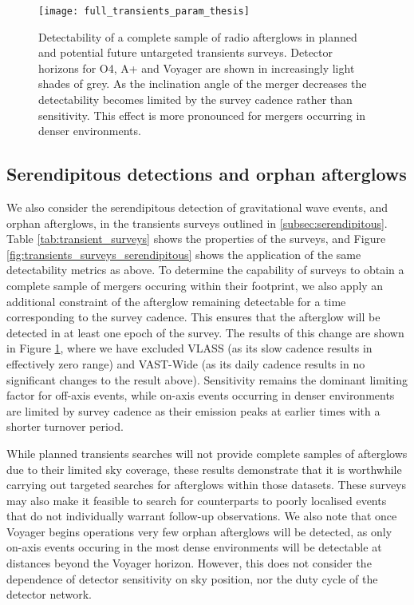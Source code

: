 \begin{figure}
    \centering
    \texttt{[image: full\_transients\_param\_thesis]}
    \vspace{-12pt}
    \caption[Complete sample of afterglows in future radio transients surveys]{Detectability of a complete sample of radio afterglows in planned and potential future untargeted transients surveys. Detector horizons for O4, A+ and Voyager are shown in increasingly light shades of grey. As the inclination angle of the merger decreases the detectability becomes limited by the survey cadence rather than sensitivity. This effect is more pronounced for mergers occurring in denser environments.}
    \label{fig:transients_surveys_full}
\end{figure}

\vspace{-5pt}
\subsection{Serendipitous detections and orphan afterglows}
\vspace{-5pt}
We also consider the serendipitous detection of gravitational wave events, and orphan afterglows, in the transients surveys outlined in \ref{subsec:serendipitous}. Table \ref{tab:transient_surveys} shows the properties of the surveys, and Figure \ref{fig:transients_surveys_serendipitous} shows the application of the same detectability metrics as above.  To determine the capability of surveys to obtain a complete sample of mergers occuring within their footprint, we also apply an additional constraint of the afterglow remaining detectable for a time corresponding to the survey cadence. This ensures that the afterglow will be detected in at least one epoch of the survey. The results of this change are shown in Figure \ref{fig:transients_surveys_full}, where we have excluded VLASS (as its slow cadence results in effectively zero range) and VAST-Wide (as its daily cadence results in no significant changes to the result above). Sensitivity remains the dominant limiting factor for off-axis events, while on-axis events occurring in denser environments are limited by survey cadence as their emission peaks at earlier times with a shorter turnover period.

While planned transients searches will not provide complete samples of afterglows due to their limited sky coverage, these results demonstrate that it is worthwhile carrying out targeted searches for afterglows within those datasets. These surveys may also make it feasible to search for counterparts to poorly localised events that do not individually warrant follow-up observations. We also note that once Voyager begins operations very few orphan afterglows will be detected, as only on-axis events occuring in the most dense environments will be detectable at distances beyond the Voyager horizon. However, this does not consider the dependence of detector sensitivity on sky position, nor the duty cycle of the detector network.



